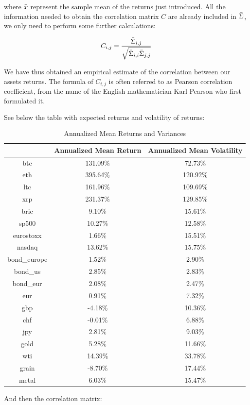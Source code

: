 where $\Bar{x}$ represent the sample mean of the returns just introduced. All the information needed to obtain the correlation matrix $C$ are already included in $\Bar{\Sigma}$, we only need to perform some further calculations:

\begin{equation}
    C_{i,j} = \frac{\Bar{\Sigma}_{i,j}}{\sqrt{\Bar{\Sigma}_{i,i}\Bar{\Sigma}_{j,j}}}
\end{equation}

We have thus obtained an empirical estimate of the correlation between our assets returns. The formula of $C_{i,j}$ is often referred to as Pearson correlation coefficient, from the name of the English mathematician Karl Pearson who first formulated it.

See below the table with expected returns and volatility of returns:

\begin{table}[H]
   \begin{tabular}{c | c c}
         & Annualized Mean Return & Annualized Mean Volatility\\ \hline
        btc & 131.09\% & 72.73\%\\
        eth & 395.64\% & 120.92\%\\
        ltc & 161.96\% & 109.69\%\\
        xrp & 231.37\% & 129.85\%\\
        bric & 9.10\% & 15.61\%\\
        sp500 & 10.27\% & 12.58\%\\
        eurostoxx & 1.66\% & 15.51\%\\
        nasdaq & 13.62\% & 15.75\%\\
        bond\_europe & 1.52\% & 2.90\%\\
        bond\_us & 2.85\% & 2.83\%\\
        bond\_eur & 2.08\% & 2.47\%\\
        eur & 0.91\% & 7.32\%\\
        gbp & -4.18\% & 10.36\%\\
        chf & -0.01\% & 6.88\%\\
        jpy & 2.81\% & 9.03\%\\
        gold & 5.28\% & 11.66\%\\
        wti & 14.39\% & 33.78\%\\
        grain & -8.70\% & 17.44\%\\
        metal & 6.03\% & 15.47\%\\
        \hline
    \end{tabular}
    \caption{Annualized Mean Returns and Variances}
\end{table}
\bigskip
And then the correlation matrix:

